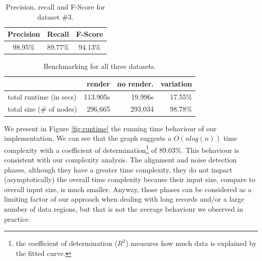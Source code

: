 \begin{table}[h]
\centering
\caption{\small{Precision, recall and F-Score for dataset $\#3$.}}
\label{table:compare3}
\begin{small}
\begin{tabular}
{| c| c| c|}\hline
	Precision	& Recall	& F-Score\\ \hline
	98.95\% & 89.77\% & 94.13\% \\ \hline
\end{tabular}
\end{small}
\end{table}

\begin{table}[h]
\centering
\caption{\small{Benchmarking for all three datasets.}}
\label{table:compare4}
\begin{small}
\begin{tabular}
{|l| r| r| r|}\hline
 & render & no render. & variation \\\hline
total runtime (in secs) & 113.905s & 19.996s & 17.55\% \\\hline
total size (\# of nodes) & 296,665 & 293,034 & 98.78\% \\\hline
\end{tabular}
\end{small}
\end{table}

We present in Figure \ref{fig:runtime} the running time behaviour of our
implementation. We can see that the graph suggests a $O(nlog(n))$ time
complexity with a coefficient of determination\footnote{the coefficient of
determination ($R^2$) measures how much data is explained by the fitted curve.}
of 89.03\%. This behaviour is consistent with our complexity analysis. The
alignment and noise detection phases, although they have a greater time
complexity, they do not impact (asymptotically) the overall time complexity
because their input size, compare to overall input size, is much smaller.
Anyway, those phases can be considered as a limiting factor of our approach when
dealing with long records and/or a large number of data regions, but that is not
the average behaviour we observed in practice.

